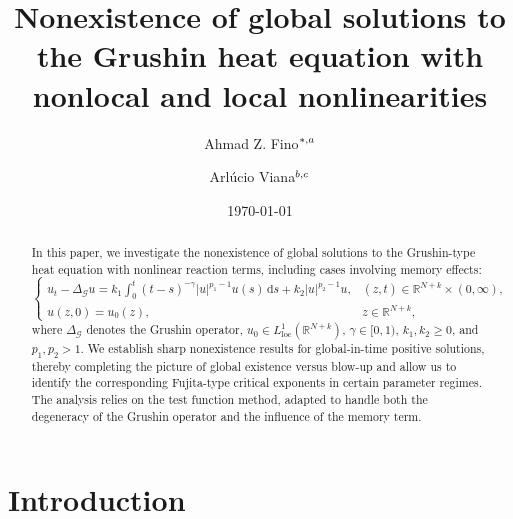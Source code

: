 \documentclass[reqno,11pt]{amsart}
\title[non-existence  to the Grushin heat equation]{Nonexistence of global solutions to the Grushin heat equation with nonlocal and local nonlinearities}
\author[A. Fino]{Ahmad Z. Fino$^{*,\lowercase{a}}$}
\author[A. Viana]{Arlúcio Viana$^{\lowercase{b,c}}$}
\numberwithin{equation}{section}
\newcommand{\abs}[1]{\lvert#1\rvert}
\begin{document}
	





\begin{abstract}
In this paper, we investigate the nonexistence of global solutions to the Grushin-type heat equation with nonlinear reaction terms, including cases involving memory effects:
	\begin{equation*}
		\left\{\begin{array}{ll}
			\displaystyle {u_{t}-\Delta_{\mathcal{G}}
				u = k_1 \int_0^t(t-s)^{-\gamma}\abs{u}^{p_1-1}u(s)\,\mathrm{d}s} + k_2|u|^{p_2-1}u, &  (z,t)\in {\mathbb{R}}^{N+k}\times (0,\infty),\\
			\displaystyle{u(z,0)=  u_0(z),\qquad\qquad}&\displaystyle{z\in {\mathbb{R}}^{N+k},}
		\end{array}
		\right.
	\end{equation*}
	where $\Delta_{\mathcal{G}}$ denotes the Grushin operator, $u_0 \in L^1_{\mathrm{loc}}(\mathbb{R}^{N+k})$, $\gamma\in[0,1)$, $k_1,k_2 \geq 0$, and $p_1,p_2>1$.
	We establish sharp nonexistence results for global-in-time positive solutions, thereby completing the picture of global existence versus blow-up and allow us to identify the corresponding Fujita-type critical exponents in certain parameter regimes.
The analysis relies on the test function method, adapted to handle both the degeneracy of the Grushin operator and the influence of the memory term.
	
	
	
\end{abstract}

\date{\today}

\maketitle



\section{Introduction}
\end{document}
